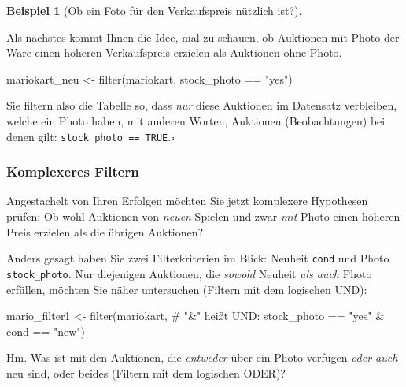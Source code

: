 \documentclass[
  a4paper,
]{scrbook}
\newenvironment{Shaded}{\begin{snugshade}}{\end{snugshade}}
\newcommand{\CommentTok}[1]{\textcolor[rgb]{0.37,0.37,0.37}{#1}}
\newcommand{\FunctionTok}[1]{\textcolor[rgb]{0.28,0.35,0.67}{#1}}
\newcommand{\NormalTok}[1]{\textcolor[rgb]{0.00,0.23,0.31}{#1}}
\newcommand{\OtherTok}[1]{\textcolor[rgb]{0.00,0.23,0.31}{#1}}
\newcommand{\SpecialCharTok}[1]{\textcolor[rgb]{0.37,0.37,0.37}{#1}}
\newcommand{\StringTok}[1]{\textcolor[rgb]{0.13,0.47,0.30}{#1}}
\theoremstyle{definition}
\newtheorem{example}{Beispiel}[chapter]
\theoremstyle{definition}
\theoremstyle{definition}
\theoremstyle{remark}
\begin{document}
\begin{example}[Ob ein Foto für den Verkaufspreis nützlich
ist?]\protect\hypertarget{exm-filter}{}\label{exm-filter}

Als nächstes kommt Ihnen die Idee, mal zu schauen, ob Auktionen mit
Photo der Ware einen höheren Verkaufspreis erzielen als Auktionen ohne
Photo.

\begin{Shaded}
\begin{Highlighting}[]
\NormalTok{mariokart\_neu }\OtherTok{\textless{}{-}} \FunctionTok{filter}\NormalTok{(mariokart, stock\_photo }\SpecialCharTok{==} \StringTok{"yes"}\NormalTok{)}
\end{Highlighting}
\end{Shaded}

Sie filtern also die Tabelle so, dass \emph{nur} diese Auktionen im
Datensatz verbleiben, welche ein Photo haben, mit anderen Worten,
Auktionen (Beobachtungen) bei denen gilt:
\texttt{stock\_photo\ ==\ TRUE}.\(\square\)

\end{example}

\subsubsection{Komplexeres Filtern}\label{komplexeres-filtern}

Angestachelt von Ihren Erfolgen möchten Sie jetzt komplexere Hypothesen
prüfen: Ob wohl Auktionen von \emph{neuen} Spielen und zwar \emph{mit}
Photo einen höheren Preis erzielen als die übrigen Auktionen?

Anders gesagt haben Sie zwei Filterkriterien im Blick: Neuheit
\texttt{cond} und Photo \texttt{stock\_photo}. Nur diejenigen Auktionen,
die \emph{sowohl} Neuheit \emph{als auch} Photo erfüllen, möchten Sie
näher untersuchen (Filtern mit dem logischen UND):

\begin{Shaded}
\begin{Highlighting}[]
\NormalTok{mario\_filter1 }\OtherTok{\textless{}{-}} 
  \FunctionTok{filter}\NormalTok{(mariokart,  }\CommentTok{\# "\&" heißt UND:}
\NormalTok{         stock\_photo }\SpecialCharTok{==} \StringTok{"yes"} \SpecialCharTok{\&}\NormalTok{ cond }\SpecialCharTok{==} \StringTok{"new"}\NormalTok{)}
\end{Highlighting}
\end{Shaded}

Hm. Was ist mit den Auktionen, die \emph{entweder} über ein Photo
verfügen \emph{oder auch} neu sind, oder beides (Filtern mit dem
logischen ODER)?
\end{document}

